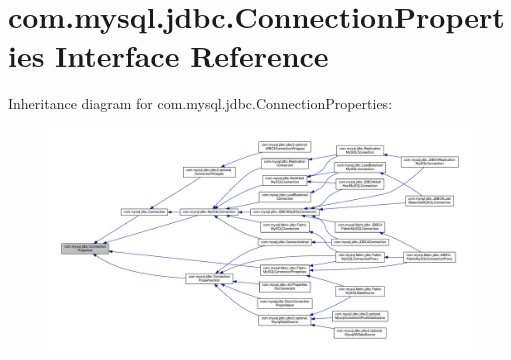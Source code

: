 \hypertarget{interfacecom_1_1mysql_1_1jdbc_1_1_connection_properties}{}\section{com.\+mysql.\+jdbc.\+Connection\+Properties Interface Reference}
\label{interfacecom_1_1mysql_1_1jdbc_1_1_connection_properties}


Inheritance diagram for com.\+mysql.\+jdbc.\+Connection\+Properties\+:\nopagebreak
\begin{figure}[H]
\begin{center}
\leavevmode
\includegraphics[width=350pt]{interfacecom_1_1mysql_1_1jdbc_1_1_connection_properties__inherit__graph}
\end{center}
\end{figure}
